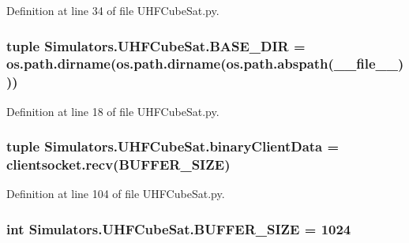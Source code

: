 Definition at line 34 of file U\+H\+F\+Cube\+Sat.\+py.

\hypertarget{namespace_simulators_1_1_u_h_f_cube_sat_adbbdaf55e4b09200f0e32d3e49e6fbec}{}
\subsubsection[{B\+A\+S\+E\+\_\+\+D\+I\+R}]{\setlength{\rightskip}{0pt plus 5cm}tuple Simulators.\+U\+H\+F\+Cube\+Sat.\+B\+A\+S\+E\+\_\+\+D\+I\+R = os.\+path.\+dirname(os.\+path.\+dirname(os.\+path.\+abspath(\+\_\+\+\_\+file\+\_\+\+\_\+)))}\label{namespace_simulators_1_1_u_h_f_cube_sat_adbbdaf55e4b09200f0e32d3e49e6fbec}


Definition at line 18 of file U\+H\+F\+Cube\+Sat.\+py.

\hypertarget{namespace_simulators_1_1_u_h_f_cube_sat_a042020fd8890c418f595709d37cbfa94}{}
\subsubsection[{binary\+Client\+Data}]{\setlength{\rightskip}{0pt plus 5cm}tuple Simulators.\+U\+H\+F\+Cube\+Sat.\+binary\+Client\+Data = clientsocket.\+recv({\bf B\+U\+F\+F\+E\+R\+\_\+\+S\+I\+Z\+E})}\label{namespace_simulators_1_1_u_h_f_cube_sat_a042020fd8890c418f595709d37cbfa94}


Definition at line 104 of file U\+H\+F\+Cube\+Sat.\+py.

\hypertarget{namespace_simulators_1_1_u_h_f_cube_sat_a77fb75361e519e64f660c4da5cca3a8d}{}
\subsubsection[{B\+U\+F\+F\+E\+R\+\_\+\+S\+I\+Z\+E}]{\setlength{\rightskip}{0pt plus 5cm}int Simulators.\+U\+H\+F\+Cube\+Sat.\+B\+U\+F\+F\+E\+R\+\_\+\+S\+I\+Z\+E = 1024}\label{namespace_simulators_1_1_u_h_f_cube_sat_a77fb75361e519e64f660c4da5cca3a8d}


